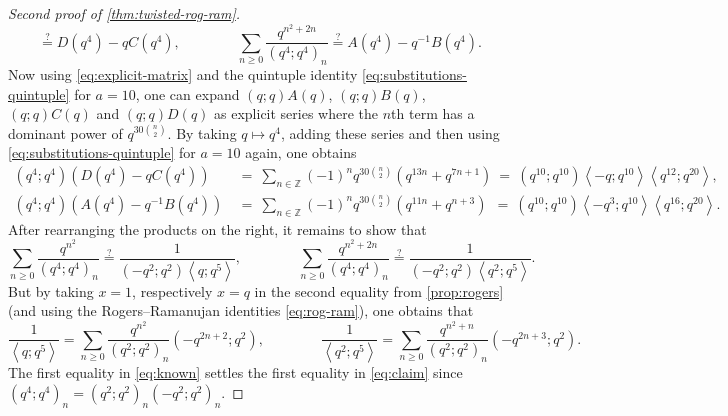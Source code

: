 \documentclass[reqno,11pt]{amsart}
\theoremstyle{definition}
\theoremstyle{remark}
\numberwithin{equation}{section}
\newcommand{\Z}{\mathbb{Z}}
\newcommand{\la}{\left\langle}
\newcommand{\ra}{\right\rangle}
\begin{document}
\begin{proof}[Second proof of \cref{thm:twisted-rog-ram}]
\[    \stackrel{?}{=}
    D\left(q^4\right) - qC\left(q^4\right)
    ,\qquad\qquad
    \sum_{n \ge 0} \frac{q^{n^2+2n}}{\left(q^4; q^4\right)_n}
    \stackrel{?}{=}
    A\left(q^4\right) - q^{-1} B\left(q^4\right).
\]
Now using \cref{eq:explicit-matrix} and the quintuple identity \cref{eq:substitutions-quintuple} for $a = 10$, one can expand $(q; q)A(q)$, $(q; q)B(q)$, $(q; q)C(q)$ and $(q; q)D(q)$ as explicit series where the $n$th term has a dominant power of $q^{30\binom{n}{2}}$. By taking $q \mapsto q^4$, adding these series and then using \cref{eq:substitutions-quintuple} for $a = 10$ again, one obtains
\[
\begin{aligned}
    \left(q^4; q^4\right) \left(D\left(q^4\right) - qC\left(q^4\right)\right) 
    &\ =\ \sum_{n \in \Z}
    (-1)^n q^{30\binom{n}{2}}\left(q^{13n} + q^{7n+1}\right)
    \ =\ 
    \left(q^{10}; q^{10}\right)\la -q; q^{10}\ra \la q^{12}; q^{20}\ra 
    , 
    \\ 
    \left(q^4; q^4\right) \left(A\left(q^4\right) - q^{-1}B\left(q^4\right)\right)
    &\ =\
    \sum_{n \in \Z}
    (-1)^n q^{30\binom{n}{2}}\left(q^{11n} + q^{n+3}\right)
    \ \ =\ 
    \left(q^{10}; q^{10}\right)\la -q^3; q^{10}\ra \la q^{16}; q^{20}\ra
    .
\end{aligned}
\]
After rearranging the products on the right, it remains to show that
\begin{equation} \label{eq:claim}
    \sum_{n \ge 0} \frac{q^{n^2}}{\left(q^4; q^4\right)_n} 
    \stackrel{?}{=}
    \frac{1}{\left(-q^2; q^2\right) \la q; q^5 \ra}
    ,\qquad\qquad
    \sum_{n \ge 0} \frac{q^{n^2+2n}}{\left(q^4; q^4\right)_n}
    \stackrel{?}{=}
    \frac{1}{\left(-q^2; q^2\right) \la q^2; q^5 \ra}.
\end{equation}
But by taking $x = 1$, respectively $x = q$ in the second equality from \cref{prop:rogers} (and using the Rogers--Ramanujan identities \cref{eq:rog-ram}), one obtains that
\begin{equation}\label{eq:known}
    \frac{1}{\la q; q^5 \ra} = \sum_{n \ge 0} \frac{q^{n^2}}{\left(q^2; q^2\right)_n} \left(-q^{2n+2}; q^2\right),
    \qquad\qquad
    \frac{1}{\la q^2; q^5 \ra} = \sum_{n \ge 0} \frac{q^{n^2+n}}{\left(q^2; q^2\right)_n} \left(-q^{2n+3}; q^2\right).
\end{equation}
The first equality in \cref{eq:known} settles the first equality in \cref{eq:claim} since $\left(q^4; q^4\right)_n = \left(q^2; q^2\right)_n \left(-q^2; q^2\right)_n$. 


\end{proof}
\end{document}

